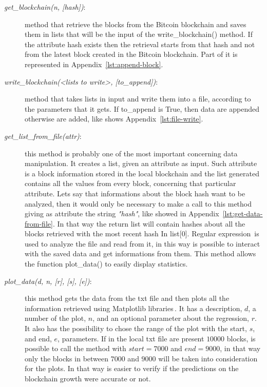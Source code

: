 \documentclass[USenglish]{uit-thesis}
\begin{document}
\begin{description}
	\item [\emph{get\_blockchain(n, [hash])}:] method that retrieve the blocks
	from the Bitcoin blockchain and saves them in lists that will be the input
	of the write\_blockchain() method. If the attribute hash exists then the retrieval
	starts from that hash and not from the latest block created in the Bitcoin blockchain.
	Part of it is represented in Appendix~\ref{lst:append-block}.
	\item [\emph{write\_blockchain(<lists to write>, [to\_append])}:] method that takes lists in input and write them into a file,
	according to the parameters that it gets. If to\_append is True, then data are appended otherwise are added, like
	shows Appendix~\ref{lst:file-write}.
	\item [\emph{get\_list\_from\_file(attr)}:] this method is probably one of the most important concerning data
	manipulation. It creates a list, given an attribute as input. Such attribute is a block information stored in the
	local blockchain and the list generated contains all the values from every block, concerning that
	particular  attribute.
	Lets say that informations about the block hash want to be analyzed, then it would only be necessary
	to make a call to this method giving as attribute the string \emph{"hash"}, like showed in Appendix~\ref{lst:get-data-from-file}.
	In that way the return list will contain hashes about all the blocks retrieved with the most recent hash In list[$0$].
	Regular expression\,\cite{Aho:1992:FCS} is used to analyze the file and read from it, in this way is possible
	to interact with the saved data and get informations from them. This method allows the
	function plot\_data() to easily display statistics.
	\item [\emph{plot\_data(d, n, [r], [s], [e])}:] this method gets the data from the
	txt file and then plots all the information retrieved using Matplotlib libraries\,\cite{matplotlib}. It has
	a description, $d$, a number of the plot, $n$, and an optional parameter about the
	regression, $r$. It also has the possibility to chose the range of the plot with the start, $s$, and end, $e$,
	parameters. If in the local txt file are present $10000$ blocks, is possible to call the method with
	$start=7000$ and $end=9000$, in that way only the blocks in between $7000$ and $9000$
	will be taken into consideration for the plots. In that way is easier to verify if the predictions on
	the blockchain growth were accurate or not.
\end{description}
\end{document}
